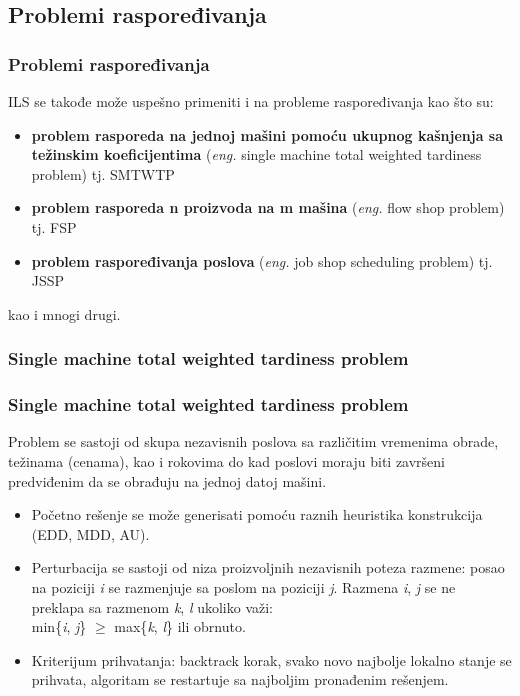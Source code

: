 \documentclass{beamer}
\newcommand{\eng}[1]{(\textit{eng.} #1)}
\begin{document}
\subsection{Problemi raspoređivanja}
\begin{frame}[fragile]\frametitle{Problemi raspoređivanja}
ILS se takođe može uspešno primeniti i na probleme raspoređivanja kao što su:
\begin{itemize}
  \item \textbf{problem rasporeda na jednoj mašini pomoću ukupnog kašnjenja sa težinskim koeficijentima} \eng{single machine total weighted tardiness problem} tj. SMTWTP
  \item \textbf{problem rasporeda n proizvoda na m mašina} \eng{flow shop problem} tj. FSP
  \item \textbf{problem raspoređivanja poslova} \eng{job shop scheduling problem} tj. JSSP
\end{itemize}
kao i mnogi drugi.
\end{frame}

\subsubsection{Single machine total weighted tardiness problem}
\begin{frame}[fragile]\frametitle{Single machine total weighted tardiness problem}
Problem se sastoji od skupa nezavisnih poslova sa različitim vremenima obrade, težinama (cenama), kao i rokovima do kad poslovi moraju biti završeni predviđenim da se obrađuju na jednoj datoj mašini. \\
\begin{itemize}
  \item Početno rešenje se može generisati pomoću raznih heuristika konstrukcija (EDD, MDD, AU).
  \item Perturbacija se sastoji od niza proizvoljnih nezavisnih poteza razmene: posao na poziciji \textit{i} se razmenjuje sa poslom na poziciji \textit{j}. Razmena \textit{i}, \textit{j} se ne preklapa sa razmenom \textit{k}, \textit{l} ukoliko važi:\\ min\{\textit{i}, \textit{j}\} $\geq$ max\{\textit{k}, \textit{l}\} ili obrnuto.
  \item Kriterijum prihvatanja: backtrack korak, svako novo najbolje lokalno stanje se prihvata, algoritam se restartuje sa najboljim pronađenim rešenjem.
\end{itemize}
\end{frame}
\end{document}
